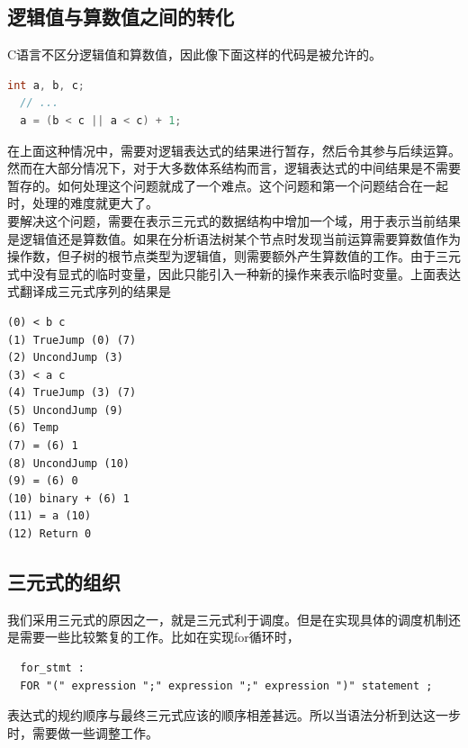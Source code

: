 \documentclass[12pt,a4paper,Flow]{report}
\begin{document}
\subsection{逻辑值与算数值之间的转化}
C语言不区分逻辑值和算数值，因此像下面这样的代码是被允许的。
\begin{lstlisting}[language=c]
  int a, b, c;
  // ...
  a = (b < c || a < c) + 1;
\end{lstlisting}
在上面这种情况中，需要对逻辑表达式的结果进行暂存，然后令其参与后续运算。然而在大部分情况下，对于大多数体系结构而言，逻辑表达式的中间结果是不需要暂存的。如何处理这个问题就成了一个难点。这个问题和第一个问题结合在一起时，处理的难度就更大了。\\
\indent 要解决这个问题，需要在表示三元式的数据结构中增加一个域，用于表示当前结果是逻辑值还是算数值。如果在分析语法树某个节点时发现当前运算需要算数值作为操作数，但子树的根节点类型为逻辑值，则需要额外产生算数值的工作。由于三元式中没有显式的临时变量，因此只能引入一种新的操作来表示临时变量。上面表达式翻译成三元式序列的结果是
\begin{verbatim}
(0) < b c 
(1) TrueJump (0) (7) 
(2) UncondJump (3) 
(3) < a c 
(4) TrueJump (3) (7) 
(5) UncondJump (9) 
(6) Temp 
(7) = (6) 1 
(8) UncondJump (10) 
(9) = (6) 0 
(10) binary + (6) 1 
(11) = a (10) 
(12) Return 0 
\end{verbatim}
\subsection{三元式的组织}
我们采用三元式的原因之一，就是三元式利于调度。但是在实现具体的调度机制还是需要一些比较繁复的工作。比如在实现for循环时，
\begin{lstlisting}
  for_stmt :
  FOR "(" expression ";" expression ";" expression ")" statement ;
\end{lstlisting}
表达式的规约顺序与最终三元式应该的顺序相差甚远。所以当语法分析到达这一步时，需要做一些调整工作。
\end{document}
